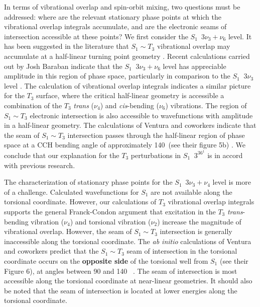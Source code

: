 In terms of vibrational overlap and spin-orbit mixing, two questions
must be addressed: where are the relevant stationary phase points at
which the vibrational overlap integrals accumulate, and are the
electronic seams of intersection accessible at these points?  We first
consider the $S_1 \:\; 3\nu_3 + \nu_6$ level.  It has been suggested
in the literature that $S_1 \sim T_3$ vibrational overlap may
accumulate at a half-linear turning point geometry \cite{mizoguchi00}.
Recent calculations carried out by Josh Baraban indicate that the $S_1
\;\; 3\nu_3 + \nu_6$ level has appreciable amplitude in this region of
phase space, particularly in comparison to the $S_1 \;\; 3\nu_3$ level
\cite{baraban08}.  The calculation of vibrational overlap integrals
indicates a similar picture for the $T_3$ surface, where the critical
half-linear geometry is accessible a combination of the $T_3$
\emph{trans} ($\nu_4$) and \emph{cis}-bending ($\nu_6$) vibrations.
The region of $S_1 \sim T_3$ electronic intersection is also
accessible to wavefunctions with amplitude in a half-linear geometry.
The calculations of Ventura and coworkers indicate that the seam of
$S_1 \sim T_3$ intersection passes through the half-linear region of
phase space at a CCH bending angle of approximately 140\degrees\ (see
their figure 5b) \cite{ventura03}.  We conclude that our explanation
for the $T_3$ perturbations in $S_1 \;\; 3^36^1$  is in accord
with previous research.

The characterization of stationary phase points for the $S_1 \:\;
3\nu_3 + \nu_4$ level is more of a challenge.  Calculated
wavefunctions for $S_1$ are not available along the torsional
coordinate.  However, our calculations of $T_3$ vibrational overlap
integrals supports the general Franck-Condon argument that excitation
in the $T_3$ \emph{trans}-bending vibration ($\nu_4$) and torsional
vibration ($\nu_2$) increase the magnitude of vibrational overlap.
However, the seam of $S_1 \sim T_3$ intersection is generally
inaccessible along the torsional coordinate.  The \emph{ab initio}
calculations of Ventura and coworkers predict that the $S_1 \sim T_3$
seam of intersection in the torsional coordinate occurs on the
\textbf{opposite side} of the torsional well from $S_1$ (see their
Figure 6), at angles between 90 and 140 \degrees\ \cite{ventura03}.
The seam of intersection is most accessible along the torsional
coordinate at near-linear geometries.  It should also be noted
that the seam of intersection is located at lower energies along the
torsional coordinate.

